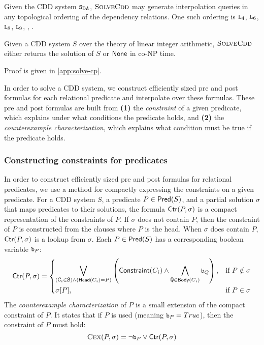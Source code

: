 %
\begin{ex}
  Given the CDD system $\mcchc$, $\textsc{SolveCdd}$ may generate interpolation
  queries in any topological ordering of the dependency relations.
  One such ordering is $\cc{L}_4$, $\cc{L}_6$, $\cc{L}_8$, $\cc{L}_9$, ,
  .
\end{ex}

\begin{thm}
  \label{thm:solve-cp}
  Given a CDD system $S$ over the theory of linear integer arithmetic,
  $\textsc{SolveCdd}$ either returns the solution of $S$ or $\mathsf{None}$ in co-NP
  time.
\end{thm}
Proof is given in \autoref{app:solve-cp}.

In order to solve a CDD system, we construct efficiently sized pre and
post formulas for each relational predicate and interpolate over these
formulas. These pre and post formulas are built from \textbf{(1)} the
\emph{constraint} of a given predicate, which explains under what
conditions the predicate holds, and \textbf{(2)} the
\emph{counterexample characterization}, which explains what condition
must be true if the predicate holds.

%
\subsubsection{Constructing constraints for predicates}
%
In order to construct efficiently sized pre and post formulas for
relational predicates, we use a method for compactly expressing the
constraints on a given predicate.
%
For a CDD system $S$, a predicate $P \in \mathsf{Pred}( S )$, and a partial
solution $\sigma$ that maps predicates to their solutions, the formula
$\mathsf{Ctr}(P,\sigma)$ is a compact representation of the constraints of
$P$.
%
If $\sigma$ does not contain $P$, then the constraint of $P$ is
constructed from the clauses where $P$ is the head.  When $\sigma$
does contain $P$, $\mathsf{Ctr}(P,\sigma)$ is a lookup from $\sigma$.
%
Each $P \in \mathsf{Pred}( S )$ has a corresponding boolean variable
$\cc{b}_P$:
%
\[
  \ctrof{P,\sigma}=
  \begin{dcases}
    \biglor_{(\cc{C}_i \in \cc{S}) \land (\headof{C_i} = P)}
    \left( \consof{C_i} \land %
      \bigland_{ \cc{Q} \in \bodyof{C_i}} \cc{b}_Q
    \right),
  &\text{if } P \notin \sigma\\
  \sigma[P], &\text{if } P \in \sigma
  \end{dcases}
\]
%
The \emph{counterexample characterization} of $P$ is a small extension
of the compact constraint of $P$.
%
It states that if $P$ is used
(meaning $\cc{b}_{P} = True$), then the constraint of $P$ must hold:
\[
  \vc{P,\sigma} = \neg \cc{b}_{P} \lor \ctrof{P,\sigma}
\]


